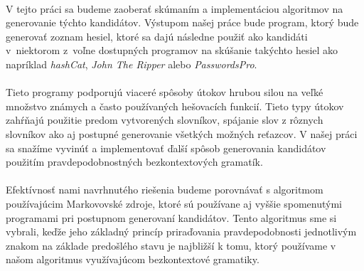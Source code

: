 \paragraph{}
V tejto práci sa budeme zaoberať skúmaním a implementáciou algoritmov na generovanie týchto kandidátov. Výstupom našej práce bude program, ktorý bude generovať zoznam hesiel, ktoré sa dajú následne použiť ako kandidáti v~niektorom z~voľne dostupných programov na skúšanie takýchto hesiel ako napríklad \emph{hashCat}, \emph{John The Ripper} alebo \emph{PasswordsPro}.

\paragraph{}
Tieto programy podporujú viaceré spôsoby útokov hrubou silou na veľké množstvo známych a často používaných hešovacích funkcií. Tieto typy útokov zahŕňajú použitie predom vytvorených slovníkov, spájanie slov z rôznych slovníkov ako aj postupné generovanie všetkých možných reťazcov. V našej práci sa snažíme vyvinúť a implementovať ďalší spôsob generovania kandidátov použitím pravdepodobnostných bezkontextových gramatík.

\paragraph{}
Efektívnosť nami navrhnutého riešenia budeme porovnávať s algoritmom používajúcim Markovovské zdroje, ktoré sú používane aj vyššie spomenutými programami pri postupnom generovaní kandidátov. Tento algoritmus sme si vybrali, keďže jeho základný princíp priraďovania pravdepodobnosti jednotlivým znakom na základe predošlého stavu je najbližší k tomu, ktorý používame v našom algoritmus využívajúcom bezkontextové gramatiky.